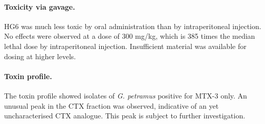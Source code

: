 \documentclass[12pt]{article}
\begin{document}
\paragraph{Toxicity via gavage.}
 HG6 was much less toxic by oral administration than by intraperitoneal injection. No effects were observed at a dose of 300 mg/kg, which is 385 times the median lethal dose by intraperitoneal injection. Insufficient material was available for dosing at higher levels.​



\paragraph{Toxin profile.}
The toxin profile showed isolates of \emph{G. petramus} positive for MTX-3 only. An unusual peak in the CTX fraction was observed, indicative of an yet uncharacterised CTX analogue. This peak is subject to further investigation. \\

\newpage
\end{document}
